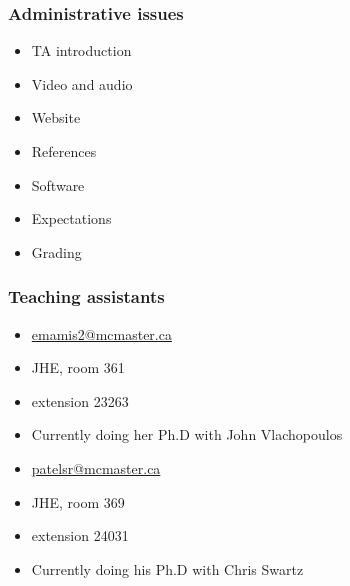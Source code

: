 \begin{frame}\frametitle{Administrative issues}
	\begin{itemize}
		\item	TA introduction 
		\item	Video and audio 
		\item	Website 
		\item	References 
		\item	Software 
		\item	Expectations 
		\item	Grading 
	\end{itemize}
\end{frame}

\begin{frame}\frametitle{Teaching assistants}
	\vspace{12pt}
	{\color{myGreen}{Maryam Emami}}
	\begin{itemize}
		\item	\url{emamis2@mcmaster.ca}
		\item	JHE, room 361
		\item	extension  23263
		\item	Currently doing her Ph.D with John Vlachopoulos
	\end{itemize}
	\vspace{12pt}
	{\color{myGreen}{Shailesh Patel}}
	\begin{itemize}
		\item	\url{patelsr@mcmaster.ca}
		\item	JHE, room 369
		\item	extension 24031
		\item	Currently doing his Ph.D with Chris Swartz
	\end{itemize}
	\vspace{24pt}

	{\color{myOrange}{Office hours for both TAs are by email appointment}}
\end{frame}

